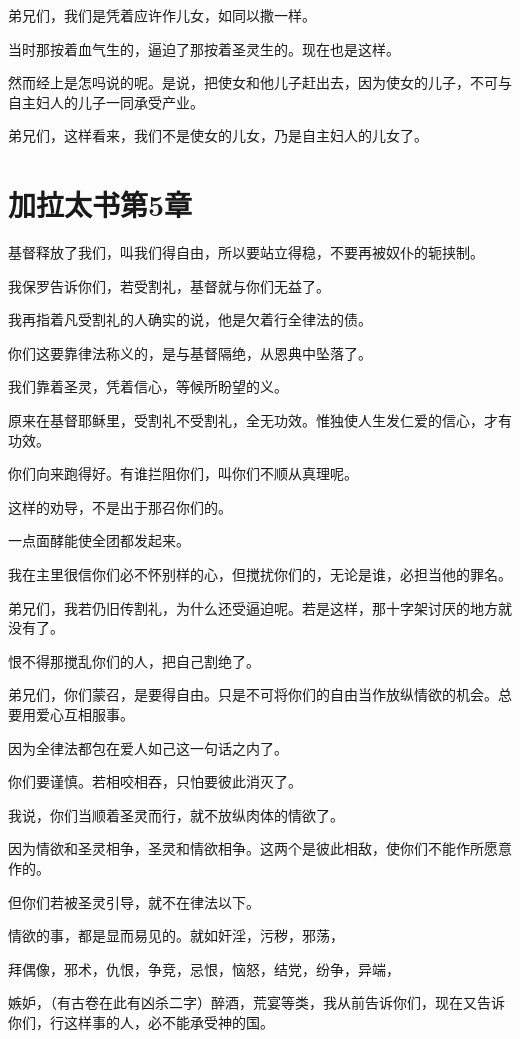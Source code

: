 \documentclass[12pt,oneside]{book}
\begin{document}
弟兄们，我们是凭着应许作儿女，如同以撒一样。

当时那按着血气生的，逼迫了那按着圣灵生的。现在也是这样。

然而经上是怎吗说的呢。是说，把使女和他儿子赶出去，因为使女的儿子，不可与自主妇人的儿子一同承受产业。

弟兄们，这样看来，我们不是使女的儿女，乃是自主妇人的儿女了。

\chapter{加拉太书第5章}
基督释放了我们，叫我们得自由，所以要站立得稳，不要再被奴仆的轭挟制。

我保罗告诉你们，若受割礼，基督就与你们无益了。

我再指着凡受割礼的人确实的说，他是欠着行全律法的债。

你们这要靠律法称义的，是与基督隔绝，从恩典中坠落了。

我们靠着圣灵，凭着信心，等候所盼望的义。

原来在基督耶稣里，受割礼不受割礼，全无功效。惟独使人生发仁爱的信心，才有功效。

你们向来跑得好。有谁拦阻你们，叫你们不顺从真理呢。

这样的劝导，不是出于那召你们的。

一点面酵能使全团都发起来。

我在主里很信你们必不怀别样的心，但搅扰你们的，无论是谁，必担当他的罪名。

弟兄们，我若仍旧传割礼，为什么还受逼迫呢。若是这样，那十字架讨厌的地方就没有了。

恨不得那搅乱你们的人，把自己割绝了。

弟兄们，你们蒙召，是要得自由。只是不可将你们的自由当作放纵情欲的机会。总要用爱心互相服事。

因为全律法都包在爱人如己这一句话之内了。

你们要谨慎。若相咬相吞，只怕要彼此消灭了。

我说，你们当顺着圣灵而行，就不放纵肉体的情欲了。

因为情欲和圣灵相争，圣灵和情欲相争。这两个是彼此相敌，使你们不能作所愿意作的。

但你们若被圣灵引导，就不在律法以下。

情欲的事，都是显而易见的。就如奸淫，污秽，邪荡，

拜偶像，邪术，仇恨，争竞，忌恨，恼怒，结党，纷争，异端，

嫉妒，（有古卷在此有凶杀二字）醉酒，荒宴等类，我从前告诉你们，现在又告诉你们，行这样事的人，必不能承受神的国。
\end{document}
